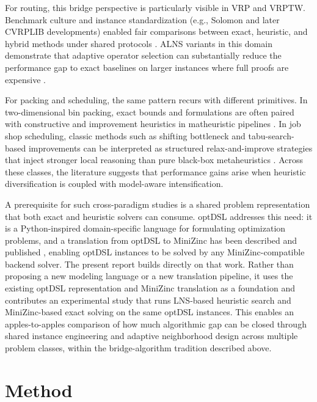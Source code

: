 \documentclass[11pt,a4paper]{article}
\begin{document}
For routing, this bridge perspective is particularly visible in VRP and VRPTW.
Benchmark culture and instance standardization (e.g., Solomon and later CVRPLIB developments) enabled fair comparisons between exact, heuristic, and hybrid methods under shared protocols \citep{solomon1987vrptw,toth2014vrp,uchoa2017cvrplib}.
ALNS variants in this domain demonstrate that adaptive operator selection can substantially reduce the performance gap to exact baselines on larger instances where full proofs are expensive \citep{ropke2006alns,pisinger2010lns,pisinger2019lns}.

For packing and scheduling, the same pattern recurs with different primitives.
In two-dimensional bin packing, exact bounds and formulations are often paired with constructive and improvement heuristics in matheuristic pipelines \citep{lodi2002twodimensional,hopper2001genetic,hopper2001ejor,berkey1987,wang1983}.
In job shop scheduling, classic methods such as shifting bottleneck and tabu-search-based improvements can be interpreted as structured relax-and-improve strategies that inject stronger local reasoning than pure black-box metaheuristics \citep{adams1988shifting,taillard1993benchmarks,jain1999jssp,lawrence1984,applegate1991,storer1992}.
Across these classes, the literature suggests that performance gains arise when heuristic diversification is coupled with model-aware intensification.

A prerequisite for such cross-paradigm studies is a shared problem representation that both exact and heuristic solvers can consume.
optDSL addresses this need: it is a Python-inspired domain-specific language for formulating optimization problems, and a translation from optDSL to MiniZinc has been described and published \citep{delrio2026optdsl}, enabling optDSL instances to be solved by any MiniZinc-compatible backend solver.
The present report builds directly on that work.
Rather than proposing a new modeling language or a new translation pipeline, it uses the existing optDSL representation and MiniZinc translation as a foundation and contributes an experimental study that runs LNS-based heuristic search and MiniZinc-based exact solving on the same optDSL instances.
This enables an apples-to-apples comparison of how much algorithmic gap can be closed through shared instance engineering and adaptive neighborhood design across multiple problem classes, within the bridge-algorithm tradition described above.

\section{Method}
\end{document}
